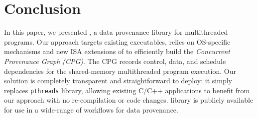 \section{Conclusion}
\label{sec:conclusion}

In this paper, we presented \projecttitle, a data provenance library for multithreaded programs. Our approach targets existing executables, relies on OS-specific mechanisms and new ISA extensions of \intelpt  to efficiently build the {\em Concurrent Provenance Graph (CPG)}. The CPG records control, data, and schedule dependencies for the shared-memory multithreaded program execution. Our solution is completely transparent and straightforward to deploy: it simply replaces {\tt pthreads} library, allowing existing C/C++ applications to benefit from our approach with no re-compilation or code changes. \projecttitle library is publicly available for use in a wide-range of workflows for data provenance.

